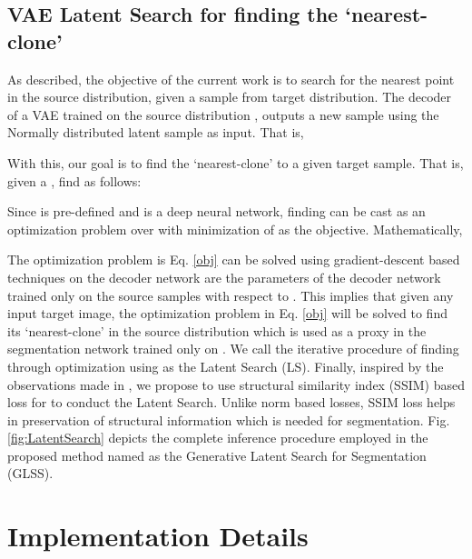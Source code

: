 \documentclass[runningheads]{llncs}
\begin{document}
\subsection{VAE Latent Search for finding the `nearest-clone'}
As described, the objective of the current work is to search for the nearest point in the source distribution, given a sample from target distribution. The decoder  of a VAE trained on the source distribution , outputs a new sample using the Normally distributed latent sample as input. That is, 


With this, our goal is to find the `nearest-clone' to a given target sample. That is, given a , find  as follows:



Since  is pre-defined and  is a deep neural network, finding  can be cast as an optimization problem over  with minimization of  as the objective. Mathematically, 




The optimization problem is Eq. \ref{obj} can be solved using gradient-descent based techniques on the decoder network   are the parameters of the decoder network trained only on the source samples   with respect to . This implies that given any input target image, the optimization problem in Eq. \ref{obj} will be solved to find its `nearest-clone' in the source distribution which is used as a proxy in the segmentation network trained only on . We call the iterative procedure of finding   through optimization using  as the Latent Search (LS). Finally, inspired by the observations made in \cite{hore2010image}, we propose to use structural similarity index (SSIM) \cite{wang2004image} based loss  for  to conduct the Latent Search. Unlike norm based losses, SSIM loss helps in preservation of structural information which is needed for segmentation. Fig. \ref{fig:LatentSearch} depicts the complete inference procedure employed in the proposed method named as the Generative Latent Search for Segmentation (GLSS).
\section{Implementation Details}
\end{document}
